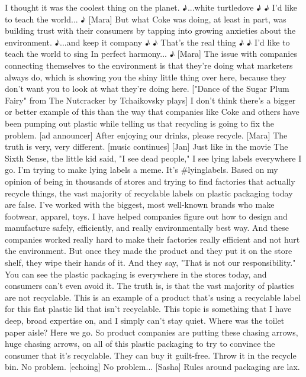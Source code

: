 \documentclass[a4paper]{article}
\begin{document}
	I thought it was the coolest thing on the planet.
	♪...white turtledove ♪
	♪ I'd like to teach the world... ♪
	[Mara] But what Coke was doing, at least in part,
	was building trust with their consumers
	by tapping into growing anxieties about the environment.
	♪...and keep it company ♪
	♪ That's the real thing ♪
	♪ I'd like to teach the world to sing In perfect harmony... ♪
	[Mara] The issue with companies connecting themselves to the environment
	is that they're doing what marketers always do,
	which is showing you the shiny little thing over here,
	because they don't want you to look at what they're doing here.
	["Dance of the Sugar Plum Fairy" from The Nutcracker by Tchaikovsky plays]
	I don't think there's a bigger or better example of this
	than the way that companies like Coke and others have been pumping out plastic
	while telling us that recycling is going to fix the problem.
	[ad announcer] After enjoying our drinks, please recycle.
	[Mara] The truth is very, very different.
	[music continues]
	[Jan] Just like in the movie The Sixth Sense,
	the little kid said, "I see dead people,"
	I see lying labels everywhere I go.
	I'm trying to make lying labels a meme.
	It's \#lyinglabels.
	Based on my opinion of being in thousands of stores
	and trying to find factories that actually recycle things,
	the vast majority of recyclable labels on plastic packaging today are false.
	I've worked with the biggest, most well-known brands
	who make footwear, apparel, toys.
	I have helped companies figure out how to design and manufacture safely,
	efficiently, and really environmentally best way.
	And these companies worked really hard
	to make their factories really efficient and not hurt the environment.
	But once they made the product and they put it on the store shelf,
	they wipe their hands of it.
	And they say, "That is not our responsibility."
	You can see the plastic packaging is everywhere in the stores today,
	and consumers can't even avoid it.
	The truth is, is that the vast majority of plastics are not recyclable.
	This is an example of a product that's using a recyclable label
	for this flat plastic lid that isn't recyclable.
	This topic is something that I have deep, broad expertise on,
	and I simply can't stay quiet.
	Where was the toilet paper aisle?
	Here we go.
	So product companies are putting these chasing arrows,
	huge chasing arrows,
	on all of this plastic packaging
	to try to convince the consumer that it's recyclable.
	They can buy it guilt-free.
	Throw it in the recycle bin.
	No problem.
	[echoing] No problem...
	[Sasha] Rules around packaging are lax.
\end{document}
